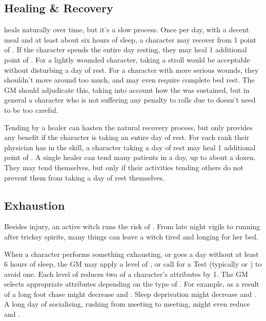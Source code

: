 \subsection{Healing \& Recovery}

 heals naturally over time, but it's a slow process.
Once per day, with a decent meal and at least about six hours of sleep, a character may recover from 1 point of .
If the character spends the entire day resting, they may heal 1 additional point of .
For a lightly wounded character, taking a stroll would be acceptable without disturbing a day of rest.
For a character with more serious wounds, they shouldn't move around too much, and may even require complete bed rest.
The GM should adjudicate this, taking into account how the  was sustained, but in general a character who is not suffering any penalty to rolls due to  doesn't need to be too careful.

Tending by a healer can hasten the natural recovery process, but only provides any benefit if the character is taking an entire day of rest.
For each rank their physician has in the  skill, a character taking a day of rest may heal 1 additional point of .
A single healer can tend many patients in a day, up to about a dozen.
They may tend themselves, but only if their activities tending others do not prevent them from taking a day of rest themselves.

\subsection{Exhaustion}
\newcommand\exhaustion{\seclink{Exhaustion}{exhaustion}}

Besides injury, an active witch runs the risk of .
From late night vigils to running after tricksy spirits, many things can leave a witch tired and longing for her bed.

When a character performs something exhausting, or goes a day without at least 6 hours of sleep, the GM may apply a level of , or call for a Test (typically  or ) to avoid one.
Each level of  reduces two of a character's attributes by 1.
The GM selects appropriate attributes depending on the type of .
For example,  as a result of a long foot chase might decrease  and .
Sleep deprivation might decrease  and .
A long day of socialising, rushing from meeting to meeting, might even reduce  and .

